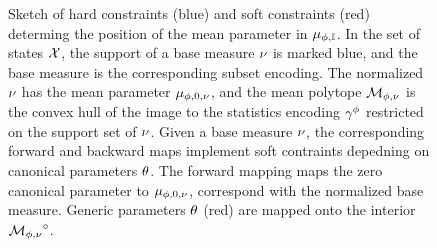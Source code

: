 \begin{figure}
    \begin{center}
        
    \end{center}
    \caption{
        Sketch of hard constraints (blue) and soft constraints (red) determing the position of the mean parameter in $\mu_{\phi,\mathbb{I}}$.
        In the set of states $\mathcal{X}$, the support of a base measure $\nu$ is marked blue, and the base measure is the corresponding subset encoding.
        The normalized $\nu$ has the mean parameter $\mu_{\phi,0,\nu}$, and the mean polytope $\mathcal{M}_{\phi,\nu}$ is the convex hull of the image to the statistics encoding $\gamma^{\phi}$ restricted on the support set of $\nu$.
        Given a base measure $\nu$, the corresponding forward and backward maps implement soft contraints depedning on canonical parameters $\theta$.
        The forward mapping maps the zero canonical parameter to $\mu_{\phi,0,\nu}$, correspond with the normalized base measure.
        Generic parameters $\theta$ (red) are mapped onto the interior ${\mathcal{M}_{\phi,\nu}}^{\circ}$.
    }\label{fig:hs_mean_sketch}
\end{figure}








